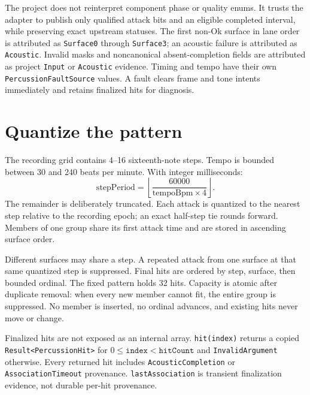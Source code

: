 \documentclass[11pt]{article}
\begin{document}
The project does not reinterpret component phase or quality enums. It trusts
the adapter to publish only qualified attack bits and an eligible completed
interval, while preserving exact upstream statuses. The first non-Ok surface
in lane order is attributed as \texttt{Surface0} through \texttt{Surface3};
an acoustic failure is attributed as \texttt{Acoustic}. Invalid masks and
noncanonical absent-completion fields are attributed as project
\texttt{Input} or \texttt{Acoustic} evidence. Timing and tempo have their own
\texttt{PercussionFaultSource} values. A fault clears frame and tone intents
immediately and retains finalized hits for diagnosis.

\section{Quantize the pattern}
The recording grid contains 4--16 sixteenth-note steps. Tempo is bounded
between 30 and 240 beats per minute. With integer milliseconds:
\[
\mathrm{stepPeriod}=\left\lfloor
\frac{60000}{\mathrm{tempoBpm}\times4}\right\rfloor .
\]
The remainder is deliberately truncated. Each attack is quantized to the
nearest step relative to the recording epoch; an exact half-step tie rounds
forward. Members of one group share its first attack time and are stored in
ascending surface order.

Different surfaces may share a step. A repeated attack from one surface at
that same quantized step is suppressed. Final hits are ordered by step,
surface, then bounded ordinal. The fixed pattern holds 32 hits. Capacity is
atomic after duplicate removal: when every new member cannot fit, the entire
group is suppressed. No member is inserted, no ordinal advances, and existing
hits never move or change.

Finalized hits are not exposed as an internal array. \texttt{hit(index)}
returns a copied \texttt{Result<PercussionHit>} for
\(0\leq\texttt{index}<\texttt{hitCount}\) and
\texttt{InvalidArgument} otherwise. Every returned hit includes
\texttt{AcousticCompletion} or \texttt{AssociationTimeout} provenance.
\texttt{lastAssociation} is transient finalization evidence, not durable
per-hit provenance.
\end{document}
